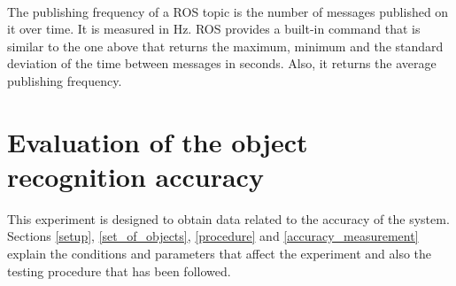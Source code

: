 		\\

		The publishing frequency of a ROS topic is the number of messages published on it over time. 
		It is measured in Hz. 
		ROS provides a built-in command that is similar to the one above that returns the maximum, minimum and the standard deviation of the time between messages in seconds. 
		Also, it returns the average publishing frequency.  



\section{Evaluation of the object recognition accuracy}
\label{accuracy_experiment}

	This experiment is designed to obtain data related to the accuracy of the system. 
	Sections \ref{setup}, \ref{set_of_objects}, \ref{procedure} and \ref{accuracy_measurement} explain the conditions and parameters that affect the experiment and also the testing procedure that has been followed. 

